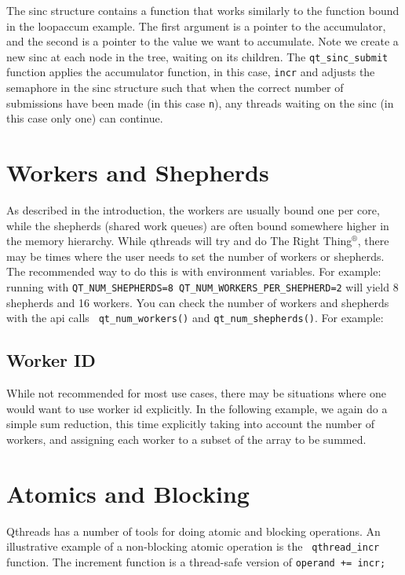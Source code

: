 \documentclass[12pt,fullpage]{article}
\begin{document}
The sinc structure contains a function that works similarly to the function
bound in the loopaccum example. The first argument is a pointer to the
accumulator, and the second is a pointer to the value we want to accumulate.
Note we create a new sinc at each node in the tree, waiting on its children. The
{\tt qt\_sinc\_submit} function applies the accumulator function, in this case,
{\tt incr} and adjusts the semaphore in the sinc structure such that when the
correct number of submissions have been made (in this case {\tt n}), any threads
waiting on the sinc (in this case only one) can continue.

\section{Workers and Shepherds}

As described in the introduction, the workers are usually bound one per core,
while the shepherds (shared work queues) are often bound somewhere higher in the
memory hierarchy. While qthreads will try and do The Right Thing$^{\circledR}$,
there may be times where the user needs to set the number of workers or
shepherds. The recommended way to do this is with environment variables. For
example: running with {\tt QT\_NUM\_SHEPHERDS=8
QT\_NUM\_WORKERS\_PER\_SHEPHERD=2} will yield 8 shepherds and 16 workers. You
can check the number of workers and shepherds with the api calls {\tt
qt\_num\_workers()} and {\tt qt\_num\_shepherds()}. For example:



\subsection{Worker ID}

While not recommended for most use cases, there may be situations where one
would want to use worker id explicitly. In the following example, we again do a
simple sum reduction, this time explicitly taking into account the number of
workers, and assigning each worker to a subset of the array to be summed.



\section{Atomics and Blocking}

Qthreads has a number of tools for doing atomic and blocking operations. An
illustrative example of a non-blocking atomic operation is the {\tt
qthread\_incr} function. The increment function is a thread-safe version of
{\tt *operand += incr;}
\end{document}
